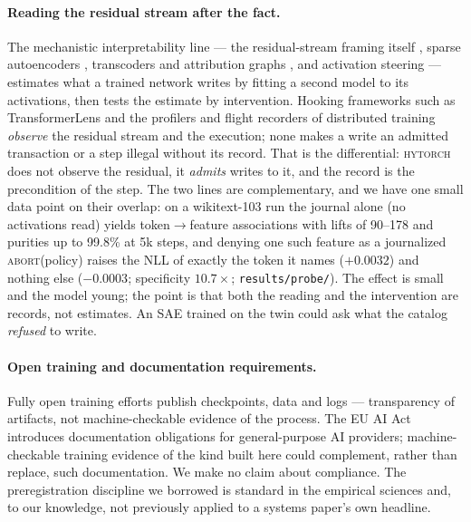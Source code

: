 \documentclass[10pt,twocolumn]{article}
\newcommand{\sys}{\textsc{hytorch}}
\begin{document}
\paragraph{Reading the residual stream after the fact.} The mechanistic
interpretability line --- the residual-stream framing itself
\cite{elhage2021framework}, sparse autoencoders
\cite{bricken2023monosemanticity,cunningham2024sae,templeton2024scaling},
transcoders and attribution graphs \cite{ameisen2025circuit}, and activation
steering \cite{turner2023actadd,zou2023repe} --- estimates what a trained
network writes by fitting a second model to its activations, then tests the
estimate by intervention. Hooking frameworks such as TransformerLens
\cite{nanda2022transformerlens} and the profilers and flight recorders of
distributed training \cite{kineto2020} \emph{observe} the residual stream and
the execution; none makes a write an admitted transaction or a step illegal
without its record. That is the differential: \sys{} does not observe the
residual, it \emph{admits} writes to it, and the record is the
precondition of the step. The two lines are complementary, and we have one
small data point on their overlap: on a wikitext-103 run the journal alone
(no activations read) yields token$\to$feature associations with lifts of
90--178 and purities up to 99.8\% at 5k steps, and denying one such feature
as a journalized \textsc{abort}(policy) raises the NLL of exactly the token it
names ($+0.0032$) and nothing else ($-0.0003$; specificity $10.7\times$;
\texttt{results/probe/}). The effect is small and the model young; the
point is that both the reading and the intervention are records, not
estimates. An SAE trained on the twin could ask what the catalog
\emph{refused} to write.

\paragraph{Open training and documentation requirements.} Fully open
training efforts \cite{groeneveld2024olmo} publish checkpoints, data and
logs --- transparency of artifacts, not machine-checkable evidence of the
process. The EU AI Act \cite{euaiact2024} introduces documentation
obligations for general-purpose AI providers; machine-checkable training
evidence of the kind built here could complement, rather than replace, such
documentation. We make no claim about compliance. The preregistration discipline we borrowed
\cite{nosek2018prereg} is standard in the empirical sciences and, to our
knowledge, not previously applied to a systems paper's own headline.
\end{document}
